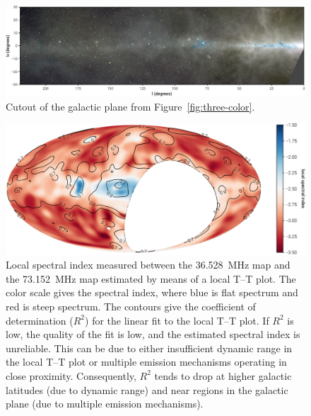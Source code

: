 \begin{bibunit}
\begin{figure}
    \centering
    \includegraphics[width=\textwidth]{figures/chapter3/ovro-lwa-galactic-plane.pdf}
    \caption{
        Cutout of the galactic plane from Figure~\ref{fig:three-color}.
    }
    \label{fig:galactic-plane-cutout}
\end{figure}

\begin{figure}[t]
    \centering
    \includegraphics[width=\textwidth]{figures/chapter3/better-internal-spectral-index}
    \caption{
        Local spectral index measured between the 36.528~MHz map and the 73.152~MHz map estimated by
        means of a local T--T plot. The color scale gives the spectral index, where blue is flat
        spectrum and red is steep spectrum. The contours give the coefficient of determination
        ($R^2$) for the linear fit to the local T--T plot. If $R^2$ is low, the quality of the fit
        is low, and the estimated spectral index is unreliable. This can be due to either
        insufficient dynamic range in the local T--T plot or multiple emission mechanisms operating
        in close proximity. Consequently, $R^2$ tends to drop at higher galactic latitudes (due to
        dynamic range) and near  regions in the galactic plane (due to multiple emission
        mechanisms).
    }
    \label{fig:internal-spectral-index}
\end{figure}


\end{bibunit}
